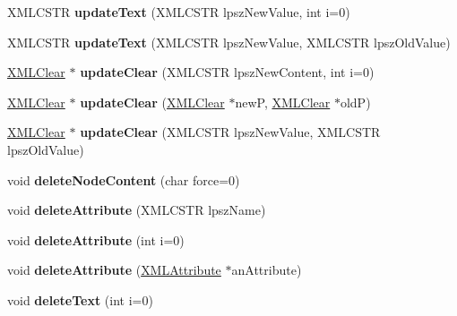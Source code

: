 \begin{DoxyCompactItemize}
X\+M\+L\+C\+S\+TR {\bfseries update\+Text} (X\+M\+L\+C\+S\+TR lpsz\+New\+Value, int i=0)
\item 
\mbox{\label{struct_x_m_l_node_a476a872fa595ea8416d2991ce3bea7a6}} 
X\+M\+L\+C\+S\+TR {\bfseries update\+Text} (X\+M\+L\+C\+S\+TR lpsz\+New\+Value, X\+M\+L\+C\+S\+TR lpsz\+Old\+Value)
\item 
\mbox{\label{struct_x_m_l_node_a6b48e123943ea53272f6d4be33ca6d04}} 
\hyperlink{struct_x_m_l_clear}{X\+M\+L\+Clear} $\ast$ {\bfseries update\+Clear} (X\+M\+L\+C\+S\+TR lpsz\+New\+Content, int i=0)
\item 
\mbox{\label{struct_x_m_l_node_a02e1a7e3f9c48e05fad77abda2116375}} 
\hyperlink{struct_x_m_l_clear}{X\+M\+L\+Clear} $\ast$ {\bfseries update\+Clear} (\hyperlink{struct_x_m_l_clear}{X\+M\+L\+Clear} $\ast$newP, \hyperlink{struct_x_m_l_clear}{X\+M\+L\+Clear} $\ast$oldP)
\item 
\mbox{\label{struct_x_m_l_node_a690b140b6d86776f3a257a42ce7d4948}} 
\hyperlink{struct_x_m_l_clear}{X\+M\+L\+Clear} $\ast$ {\bfseries update\+Clear} (X\+M\+L\+C\+S\+TR lpsz\+New\+Value, X\+M\+L\+C\+S\+TR lpsz\+Old\+Value)
\item 
\mbox{\label{struct_x_m_l_node_abbb236ca1081f145a04bce9ea03c62a6}} 
void {\bfseries delete\+Node\+Content} (char force=0)
\item 
\mbox{\label{struct_x_m_l_node_a2b21339e5b370f1d7ebde2dc51217eed}} 
void {\bfseries delete\+Attribute} (X\+M\+L\+C\+S\+TR lpsz\+Name)
\item 
\mbox{\label{struct_x_m_l_node_a61b2405305063594b35b309cc2e22c01}} 
void {\bfseries delete\+Attribute} (int i=0)
\item 
\mbox{\label{struct_x_m_l_node_a6f00d7c1b4eaa29cfdd9d4a709495aca}} 
void {\bfseries delete\+Attribute} (\hyperlink{struct_x_m_l_attribute}{X\+M\+L\+Attribute} $\ast$an\+Attribute)
\item 
\mbox{\label{struct_x_m_l_node_a14a49a23735ea10a44864cb6b4302250}} 
void {\bfseries delete\+Text} (int i=0)

\end{DoxyCompactItemize}
